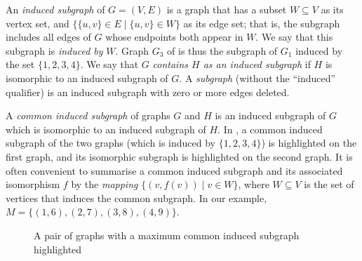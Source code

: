 An \emph{induced subgraph} of $G = (V, E)$ is a graph that has a subset $W \subseteq V$ as its
vertex set, and $\{\{u, v\} \in E \mid \{u, v\} \in W\}$ as its edge set; that
is, the subgraph includes all edges of $G$ whose endpoints both appear in
$W$.  We say that this subgraph is \emph{induced by} $W$.
Graph $G_3$ of  is thus the subgraph
of $G_1$ induced by the set $\{1,2,3,4\}$.  We say that $G$ \emph{contains
$H$ as an induced subgraph} if $H$ is isomorphic to an induced subgraph of $G$.
A \emph{subgraph} (without the ``induced'' qualifier) is an induced subgraph
with zero or more edges deleted.

A \emph{common induced subgraph} of graphs $G$ and $H$ is an induced subgraph
of $G$ which is isomorphic to an induced subgraph of $H$. In
, a common induced subgraph of the two graphs (which is
induced by $\{1,2,3,4\}$) is highlighted on the first graph, and its isomorphic
subgraph is highlighted on the second graph.  It is often convenient to summarise
a common induced subgraph and its associated isomorphism $f$ by the \emph{mapping}
$\{(v,f(v)) \mid v \in W\}$, where $W \subseteq V$ is the set of vertices that
induces the common subgraph.  In our example, $M = \{(1,6), (2,7), (3,8), (4,9)\}$.

\begin{figure}[h!]
\centering
{}
\qquad
{}
\caption{A pair of graphs with a maximum common induced subgraph highlighted}
\label{fig:cis-example}
\end{figure}

